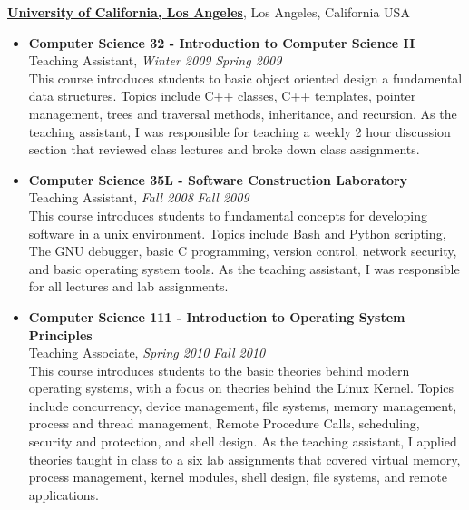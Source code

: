 \documentclass[10pt]{article}
\newenvironment{outerlist}[1][\enskip\textbullet]%
        {\begin{itemize}[#1,leftmargin=*]}{\end{itemize}%
         \vspace{-.6\baselineskip}}
\begin{document}
\href{http://www..ucla.edu}{\textbf{University of California, Los Angeles}},
Los Angeles, California USA
\begin{outerlist}

\item[] \textbf{Computer Science 32 - Introduction to Computer Science II } \\
        Teaching Assistant, \textit{Winter 2009} \textit{Spring 2009} \\

        This course introduces students to basic object oriented design a
        fundamental data structures.  Topics include C++ classes, C++ templates,
        pointer management, trees and traversal methods, inheritance, and
        recursion.  As the teaching assistant, I was responsible for teaching a
        weekly 2 hour discussion section that reviewed class lectures and broke
        down class assignments.

\item[] \textbf{Computer Science 35L - Software Construction Laboratory} \\
        Teaching Assistant, \textit{Fall 2008} \textit{Fall 2009} \\

        This course introduces students to fundamental concepts for developing
        software in a unix environment.  Topics include Bash and Python
        scripting, The GNU debugger, basic C programming, version control,
        network security, and basic operating system tools.  As the teaching
        assistant, I was responsible for all lectures and lab assignments.

\item[] \textbf{Computer Science 111 - Introduction to Operating System
                                       Principles} \\
        Teaching Associate, \textit{Spring 2010} \textit{Fall 2010} \\

        This course introduces students to the basic theories behind modern
        operating systems, with a focus on theories behind the Linux Kernel.
        Topics include concurrency, device management, file systems, memory
        management, process and thread management, Remote Procedure Calls,
        scheduling, security and protection, and shell design.  As the teaching
        assistant, I applied theories taught in class to a six lab assignments
        that covered virtual memory, process management, kernel modules, shell
        design, file systems, and remote applications.  


\end{outerlist}
\end{document}
